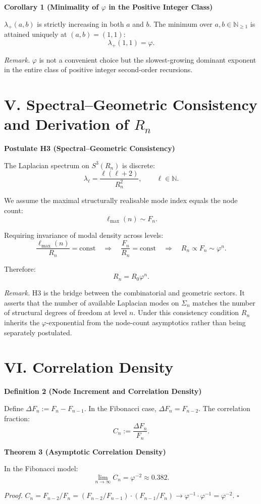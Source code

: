 \documentclass[12pt]{article}
\newcommand{\ph}{\varphi}
\newcommand{\N}{\mathbb{N}}
\begin{document}
\textbf{Corollary 1 (Minimality of $\ph$ in the Positive Integer Class)}

$\lambda_+(a,b)$ is strictly increasing in both $a$ and $b$. The minimum over $a,b\in\N_{\ge 1}$ is attained uniquely at $(a,b)=(1,1)$:
\[
\lambda_+(1,1)=\ph.
\]

\textit{Remark.} $\ph$ is not a convenient choice but the slowest-growing dominant exponent in the entire class of positive integer second-order recursions.

\section*{V. Spectral--Geometric Consistency and Derivation of $R_n$}
\textbf{Postulate H3 (Spectral--Geometric Consistency)}

The Laplacian spectrum on $S^3(R_n)$ is discrete:
\[
\lambda_{\ell}=\frac{\ell(\ell+2)}{R_n^2}, \qquad \ell\in\N.
\]

We assume the maximal structurally realisable mode index equals the node count:
\[
\ell_{\max}(n)\sim F_n.
\]

Requiring invariance of modal density across levels:
\[
\frac{\ell_{\max}(n)}{R_n}=\mathrm{const}
\quad\Rightarrow\quad
\frac{F_n}{R_n}=\mathrm{const}
\quad\Rightarrow\quad
R_n\propto F_n\sim \ph^n.
\]

Therefore:
\[
R_n=R_0\ph^n.
\]

\textit{Remark.} H3 is the bridge between the combinatorial and geometric sectors. It asserts that the number of available Laplacian modes on $\Sigma_n$ matches the number of structural degrees of freedom at level $n$. Under this consistency condition $R_n$ inherits the $\ph$-exponential from the node-count asymptotics rather than being separately postulated.

\section*{VI. Correlation Density}
\textbf{Definition 2 (Node Increment and Correlation Density)}

Define $\Delta F_n:=F_n-F_{n-1}$. In the Fibonacci case, $\Delta F_n=F_{n-2}$. The correlation fraction:
\[
C_n:=\frac{\Delta F_n}{F_n}.
\]

\textbf{Theorem 3 (Asymptotic Correlation Density)}

In the Fibonacci model:
\[
\lim_{n\to\infty} C_n = \ph^{-2}\approx 0.382.
\]

\textit{Proof.} $C_n=F_{n-2}/F_n=(F_{n-2}/F_{n-1})\cdot(F_{n-1}/F_n)\to \ph^{-1}\cdot\ph^{-1}=\ph^{-2}$. $\square$
\end{document}
